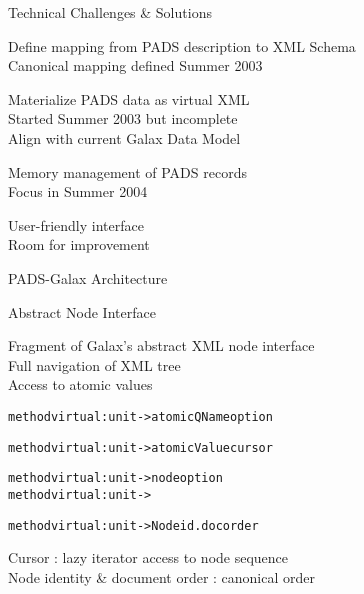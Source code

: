 \documentclass[landscape]{slides}
\begin{document}
\begin{Slide}{Technical Challenges \& Solutions}

  \bb Define mapping from PADS description to XML Schema \\
  \bbb Canonical mapping defined Summer 2003

  \bb Materialize PADS data as virtual XML \\
  \bbb Started Summer 2003 but incomplete \\
  \bbb Align with current Galax Data Model

  \bb Memory management of PADS records \\
  \bbb Focus in Summer 2004

  \bb User-friendly interface\\
  \bbb Room for improvement

\end{Slide}

\begin{Slide}{PADS-Galax Architecture} 

  \vspace*{1cm}
  \centerline{}
\end{Slide}

\begin{Slide}{Abstract Node Interface}

  \vspace*{1cm}
\bb Fragment of Galax's abstract XML node interface\\
\bbb Full navigation of XML tree\\
\bbb Access to atomic values

{\small
\begin{alltt}
  method virtual     : unit -> atomicQName option

  method virtual   : unit -> atomicValue cursor

  method virtual        : unit -> node option
  method virtual      : unit -> 

  method virtual   : unit -> Nodeid.docorder
\end{alltt}}

\bb Cursor : lazy iterator access to node sequence\\
\bb Node identity \& document order : canonical order 

\end{Slide}
\end{document}

